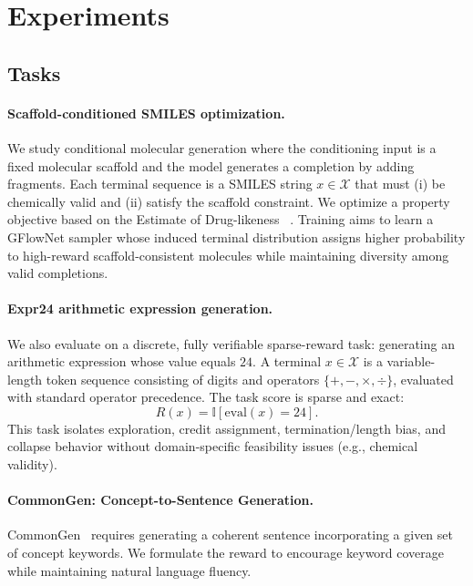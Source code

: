 \documentclass{article}
\theoremstyle{plain}
\theoremstyle{definition}
\theoremstyle{remark}
\begin{document}
\section{Experiments}
\label{sec:experiments}

\subsection{Tasks}
\label{sec:tasks}

\paragraph{Scaffold-conditioned SMILES optimization.}
We study conditional molecular generation where the conditioning input is a fixed molecular scaffold and the model generates a completion by adding fragments.
Each terminal sequence is a SMILES string $x \in \mathcal{X}$ that must (i) be chemically valid and (ii) satisfy the scaffold constraint.
We optimize a property objective based on the Estimate of Drug-likeness ~\citep{qed}.
Training aims to learn a GFlowNet sampler whose induced terminal distribution assigns higher probability to high-reward scaffold-consistent molecules while maintaining diversity among valid completions.


\paragraph{Expr24 arithmetic expression generation.}
We also evaluate on a discrete, fully verifiable sparse-reward task: generating an arithmetic expression whose value equals $24$.
A terminal $x \in \mathcal{X}$ is a variable-length token sequence consisting of digits and operators $\{+,-,\times,\div\}$, evaluated with standard operator precedence.
The task score is sparse and exact:
\[
R(x)=\mathbb{I}[\mathrm{eval}(x)=24].
\]
This task isolates exploration, credit assignment, termination/length bias, and collapse behavior without domain-specific feasibility issues (e.g., chemical validity).


\paragraph{CommonGen: Concept-to-Sentence Generation.}
CommonGen~\citep{lin2020commongen} requires generating a coherent sentence incorporating a given set of concept keywords. We formulate the reward to encourage keyword coverage while maintaining natural language fluency.
\end{document}
